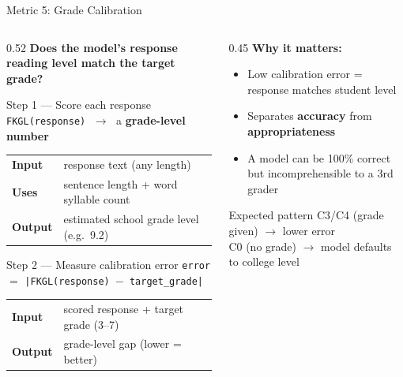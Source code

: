 \documentclass[aspectratio=169]{beamer}
\begin{document}
\begin{frame}{Metric 5: Grade Calibration}
\begin{columns}[T]
  \begin{column}{0.52\textwidth}
    \textbf{Does the model's response reading level match the target grade?}
    \vspace{0.3cm}

    \begin{block}{Step 1 --- Score each response}
      \texttt{FKGL(response)} $\;\to\;$ a \textbf{grade-level number}\\[6pt]
      \small
      \begin{tabular}{ll}
        \textbf{Input}  & response text (any length)\\
        \textbf{Uses}   & sentence length + word syllable count\\
        \textbf{Output} & estimated school grade level (e.g.\ 9.2)\\
      \end{tabular}
    \end{block}

    \vspace{0.25cm}

    \begin{block}{Step 2 --- Measure calibration error}
      \texttt{error} $=$ \texttt{|FKGL(response) $-$ target\_grade|}\\[6pt]
      \small
      \begin{tabular}{ll}
        \textbf{Input}  & scored response + target grade (3--7)\\
        \textbf{Output} & grade-level gap (lower = better)\\
      \end{tabular}
    \end{block}
  \end{column}
  \begin{column}{0.45\textwidth}
    \textbf{Why it matters:}
    \begin{itemize}\itemsep5pt
      \item Low calibration error = response matches student level
      \item Separates \textbf{accuracy} from \textbf{appropriateness}
      \item A model can be 100\% correct but incomprehensible to a 3rd grader
    \end{itemize}
    \vspace{0.2cm}
    \begin{alertblock}{Expected pattern}
      \small C3/C4 (grade given) $\to$ lower error\\
      C0 (no grade) $\to$ model defaults to college level
    \end{alertblock}
  \end{column}
\end{columns}
\end{frame}
\end{document}
